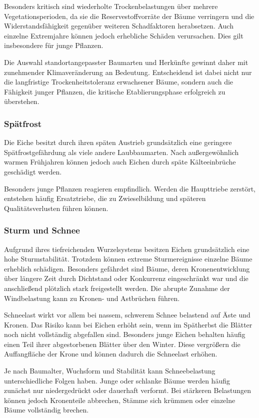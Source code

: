 \documentclass[twocolumn, bibliography=totoc, abstract=true]{scrartcl}
\begin{document}
Besonders kritisch sind wiederholte Trockenbelastungen über mehrere Vegetationsperioden, da sie die Reservestoffvorräte der Bäume verringern und die Widerstandsfähigkeit gegenüber weiteren Schadfaktoren herabsetzen. Auch einzelne Extremjahre können jedoch erhebliche Schäden verursachen. Dies gilt insbesondere für junge Pflanzen.

Die Auswahl standortangepasster Baumarten und Herkünfte gewinnt daher mit zunehmender Klimaveränderung an Bedeutung. Entscheidend ist dabei nicht nur die langfristige Trockenheitstoleranz erwachsener Bäume, sondern auch die Fähigkeit junger Pflanzen, die kritische Etablierungsphase erfolgreich zu überstehen.

\subsubsection{Spätfrost}

Die Eiche besitzt durch ihren späten Austrieb grundsätzlich eine geringere Spätfrostgefährdung als viele andere Laubbaumarten. Nach außergewöhnlich warmen Frühjahren können jedoch auch Eichen durch späte Kälteeinbrüche geschädigt werden.

Besonders junge Pflanzen reagieren empfindlich. Werden die Haupttriebe zerstört, entstehen häufig Ersatztriebe, die zu Zwieselbildung und späteren Qualitätsverlusten führen können.

\subsubsection{Sturm und Schnee}

Aufgrund ihres tiefreichenden Wurzelsystems besitzen Eichen grundsätzlich eine hohe Sturmstabilität. Trotzdem können extreme Sturmereignisse einzelne Bäume erheblich schädigen. Besonders gefährdet sind Bäume, deren Kronenentwicklung über längere Zeit durch Dichtstand oder Konkurrenz eingeschränkt war und die anschließend plötzlich stark freigestellt werden. Die abrupte Zunahme der Windbelastung kann zu Kronen- und Astbrüchen führen.

Schneelast wirkt vor allem bei nassem, schwerem Schnee belastend auf Äste und Kronen. Das Risiko kann bei Eichen erhöht sein, wenn im Spätherbst die Blätter noch nicht vollständig abgefallen sind. Besonders junge Eichen behalten häufig einen Teil ihrer abgestorbenen Blätter über den Winter. Diese vergrößern die Auffangfläche der Krone und können dadurch die Schneelast erhöhen.

Je nach Baumalter, Wuchsform und Stabilität kann Schneebelastung unterschiedliche Folgen haben. Junge oder schlanke Bäume werden häufig zunächst nur niedergedrückt oder dauerhaft verformt. Bei stärkeren Belastungen können jedoch Kronenteile abbrechen, Stämme sich krümmen oder einzelne Bäume vollständig brechen.
\end{document}
